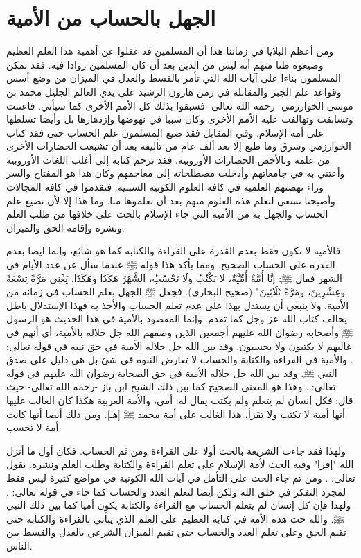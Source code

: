 \section{الجهل بالحساب من الأمية}

ومن أعظم البلايا في زماننا هذا أن المسلمين قد غفلوا عن أهمية هذا العلم العظيم وضيعوه ظنا منهم أنه ليس من الدين بعد أن كان المسلمين روادا فيه. فقد تمكن المسلمون  بناءا على آيات الله التي تأمر بالقسط والعدل في الميزان من وضع أسس وقواعد علم الجبر والمقابلة في زمن هارون الرشيد على يدي العالم الجليل محمد بن موسى الخوارزمي -رحمه الله تعالى- فسبقوا بذلك كل الأمم الأخرى كما سيأتي. فاعتنت وتسابقت وتهالفت عليه الأمم الأخرى وكان سببا في نهوضها وإزدهارها بل وأيضا تسلطها على أمة الإسلام. وفي المقابل فقد ضيع المسلمون علم الحساب حتى فقد كتاب الخوارزمي وسرق وما طبع إلا بعد ألف عام من تأليفه بعد أن تشبعت الحضارات الأخرى من علمه وبالأخص الحضارات الأوروبية. فقد ترجم كتابه إلى أغلب اللغات الأوروبية وأعتني به في جامعاتهم وأدخلت مصطلحاته إلى معاجمهم وكان هذا هو المفتاح والسر وراء نهضتهم العلمية في كافة العلوم الكونية السببية. فتقدموا في كافة المجالات وأصبحنا نسعى لتعلم هذه العلوم منهم بعد أن تعلموها منا. وما هذا إلا لأن تضيع علم الحساب والجهل به من الأمية التي جاء الإسلام بالحث على خلافها من طلب العلم ونشره وإقامة الحق والميزان. 

فالأمية لا تكون فقط بعدم القدرة على القراءة والكتابة كما هو شائع، وإنما ايضا بعدم القدرة على الحساب الصحيح. ومما يأكد هذا قوله ﷺ عندما سأل عن عدد الأيام في الشهر فقال ﷺ: إنَّا أُمَّةٌ أُمِّيَّةٌ، لا نَكْتُبُ ولَا نَحْسُبُ، الشَّهْرُ هَكَذَا وهَكَذَا. يَعْنِي مَرَّةً تِسْعَةً وعِشْرِينَ، ومَرَّةً ثَلَاثِينَ" {\footnotesize (صحيح البخاري)}. فجعل ﷺ الجهل بعلم الحساب في زمانه من الأمية. ولا ينبغي أن يستدل بهذا على عدم تعلم الحساب والأخذ به فهذا الإستدلال باطل يخالف كتاب الله عز وجل كما تقدم. وإنما المقصود بالأمية في هذا الحديث هو الرسول ﷺ وأصحابه رضوان الله عليهم أجمعين الذين وصفهم الله جل جلاله بالأمية، أي أنهم في غالبهم لا يكتبون ولا يحسبون. وقد بين الله جل جلاله الأمية في حق نبيه في قوله تعالى: \quranayah*[7][158][21]{\footnotesize \surahname*[7]}. والأمية في القراءة والكتابة والحساب لا تعارض النبوة في شئ بل هي دليل على صدق النبي ﷺ. وقد بين الله جل جلاله الأمية في حق الصحابة رضوان الله عليهم في قوله تعالى: \quranayah*[62][2]{\footnotesize \surahname*[62]}. وهذا هو المعنى الصحيح كما بين ذلك الشيخ ابن باز -رحمه الله تعالى- حيث قال: فكل إنسان لم يتعلم ولم يكتب يقال له: أمي، والأمة العربية هكذا كان الغالب عليها أنها أمية لا تكتب ولا تقرأ، هذا الغالب على أمة محمد ﷺ [هـ]. ومن ذلك أيضا أنها كانت أمة لا تحسب. 

ولهذا فقد جاءت الشريعة بالحث أولا على القراءة ومن ثم الحساب. فكان أول ما أنزل الله "إقرا" وفيه الحث لأمة الإسلام على تعلم القراءة والكتابة وطلب العلم ونشره.
يقول تعالى:
\quranayah*[96][1-5]{\footnotesize \surahname*[96]}.
ومن ثم جاء الحث على التأمل في آيات الله الكونية في مواضع كثيرة ليس فقط لمجرد التفكر في خلق الله ولكن أيضا لتعلم العدد والحساب كما جاء في قوله تعالى:
\quranayah*[10][5]{\footnotesize \surahname*[10]}. ولهذا فإن كل إنسان لم يتعلم الحساب مع القراءة والكتابة يكون أميا كما بين ذلك النبي ﷺ. والله حث هذه الأمة في كتابه العظيم على العلم الذي يتأتى بالقراءة والكتابة حتى تقيم الحق وعلى تعلم العدد والحساب حتى تقيم الميزان الشرعي بالعدل والقسط بين الناس. 

